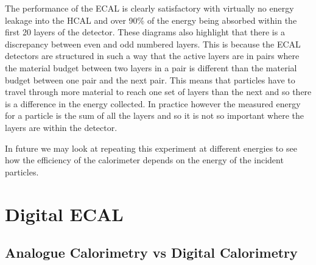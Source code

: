 The performance of the ECAL is clearly satisfactory with virtually no energy leakage into the HCAL and over 90\% of the energy being absorbed within the first 20 layers of the detector. These diagrams also highlight that there is a discrepancy between even and odd numbered layers. This is because the ECAL detectors are structured in such a way that the active layers are in pairs where the material budget between two layers in a pair is different than the material budget between one pair and the next pair. This means that particles have to travel through more material to reach one set of layers than the next and so there is a difference in the energy collected. In practice however the measured energy for a particle is the sum of all the layers and so it is not so important where the layers are within the detector.

In future we may look at repeating this experiment at different energies to see how the efficiency of the calorimeter depends on the energy of the incident particles.

\section{Digital ECAL}
\label{Sect:DECAL}

\subsection{Analogue Calorimetry vs Digital Calorimetry}

